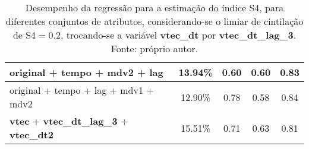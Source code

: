 \begin{table}
\begin{center}
\begin{tabular}{|l|c|c|c|c|}
original + tempo + mdv2 + lag                           & 13.94\% &  0.60  & 0.60  & 0.83 \\ \hline
original + tempo + lag + mdv1 + mdv2                    & 12.90\% &  0.78  & 0.58  & 0.84 \\ \hline
{\bf vtec} + {\bf vtec\_dt\_lag\_3} + {\bf vtec\_dt2}   & 15.51\% &  0.71  & 0.63  & 0.81 \\ \hline
\end{tabular}
\end{center}
\vspace{12pt}
\caption{Desempenho da regressão para a estimação do índice S4, para diferentes conjuntos de atributos, considerando-se o limiar de cintilação de S4$=0.2$, trocando-se a variável {\bf vtec\_dt} por {\bf vtec\_dt\_lag\_3}. Fonte: próprio autor.}
\label{tab:final_result2}
\end{table}

